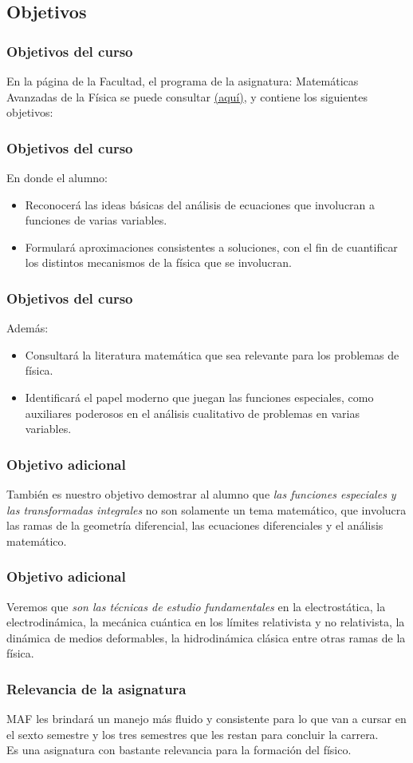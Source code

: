 \subsection{Objetivos}
\begin{frame}
\frametitle{Objetivos del curso}
En la página de la Facultad, el programa de la asignatura: Matemáticas Avanzadas de la Física se puede consultar \href{http://www.fciencias.unam.mx/asignaturas/610.pdf}{(aquí)}, y contiene los siguientes objetivos:
\end{frame}
\begin{frame}
\frametitle{Objetivos del curso}
En donde el alumno:
\begin{itemize}
\setlength{\itemsep}{0mm}
\item Reconocerá las ideas básicas del análisis de ecuaciones que involucran a funciones de varias variables.
\item Formulará aproximaciones consistentes a soluciones, con el fin de cuantificar los distintos mecanismos de la física que se involucran.
\end{itemize}
\end{frame}
\begin{frame}
\frametitle{Objetivos del curso}
Además:
\begin{itemize}
\setlength{\itemsep}{0mm}
\item Consultará la literatura matemática que sea relevante para los problemas de física.
\item Identificará el papel moderno que juegan las funciones especiales, como auxiliares poderosos en el análisis cualitativo de problemas en varias variables.
\end{itemize}
\end{frame}
\begin{frame}
\frametitle{Objetivo adicional}
También es nuestro objetivo demostrar al alumno que \emph{las funciones especiales y las transformadas integrales} no son solamente un tema matemático, que involucra las ramas de la geometría diferencial, las ecuaciones diferenciales y el análisis matemático.
\end{frame}
\begin{frame}
\frametitle{Objetivo adicional}
Veremos que \emph{son las técnicas de estudio fundamentales} en la electrostática, la electrodinámica, la mecánica cuántica en los límites relativista y no relativista, la dinámica de medios deformables, la hidrodinámica clásica entre otras ramas de la física.
\end{frame}
\begin{frame}
\frametitle{Relevancia de la asignatura}
MAF les brindará un manejo más fluido y consistente para lo que van a cursar en el sexto semestre y los tres semestres que les restan para concluir la carrera.
\\
\bigskip
\pause
Es una asignatura con bastante relevancia para la formación del físico.
\end{frame}
